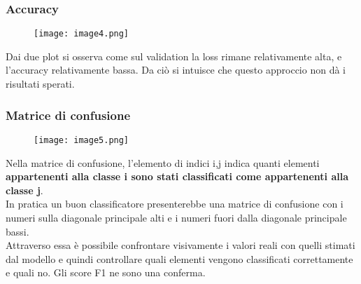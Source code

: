 \subsubsection{Accuracy}
\begin{figure}[H]
	\centering
	\texttt{[image: image4.png]}
\end{figure}
Dai due plot si osserva come sul validation la loss rimane relativamente alta, e l’accuracy relativamente bassa. Da ciò si intuisce che questo approccio non dà i risultati sperati.

\subsubsection{Matrice di confusione}
\begin{figure}[H]
	\centering
	\texttt{[image: image5.png]}
\end{figure}
Nella matrice di confusione, l'elemento di indici i,j indica quanti elementi {\bf appartenenti alla classe i sono stati classificati come appartenenti alla classe j}. \\
In pratica un buon classificatore presenterebbe una matrice di confusione con i numeri sulla diagonale principale alti e i numeri fuori dalla diagonale principale bassi. \\
Attraverso essa è possibile confrontare visivamente i valori reali con quelli stimati dal modello e quindi controllare quali elementi vengono classificati correttamente e quali no. Gli score F1 ne sono una conferma.

